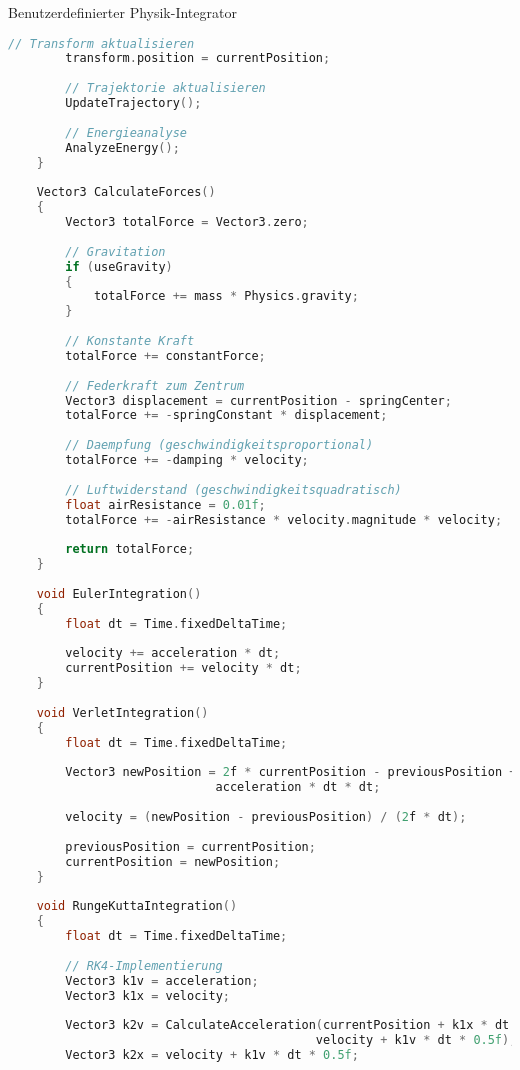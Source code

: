 \begin{code}{Benutzerdefinierter Physik-Integrator}
\begin{lstlisting}[language=C, style=basesmol]
        // Transform aktualisieren
        transform.position = currentPosition;
        
        // Trajektorie aktualisieren
        UpdateTrajectory();
        
        // Energieanalyse
        AnalyzeEnergy();
    }
    
    Vector3 CalculateForces() 
    {
        Vector3 totalForce = Vector3.zero;
        
        // Gravitation
        if (useGravity) 
        {
            totalForce += mass * Physics.gravity;
        }
        
        // Konstante Kraft
        totalForce += constantForce;
        
        // Federkraft zum Zentrum
        Vector3 displacement = currentPosition - springCenter;
        totalForce += -springConstant * displacement;
        
        // Daempfung (geschwindigkeitsproportional)
        totalForce += -damping * velocity;
        
        // Luftwiderstand (geschwindigkeitsquadratisch)
        float airResistance = 0.01f;
        totalForce += -airResistance * velocity.magnitude * velocity;
        
        return totalForce;
    }
    
    void EulerIntegration() 
    {
        float dt = Time.fixedDeltaTime;
        
        velocity += acceleration * dt;
        currentPosition += velocity * dt;
    }
    
    void VerletIntegration() 
    {
        float dt = Time.fixedDeltaTime;
        
        Vector3 newPosition = 2f * currentPosition - previousPosition + 
                             acceleration * dt * dt;
        
        velocity = (newPosition - previousPosition) / (2f * dt);
        
        previousPosition = currentPosition;
        currentPosition = newPosition;
    }
    
    void RungeKuttaIntegration() 
    {
        float dt = Time.fixedDeltaTime;
        
        // RK4-Implementierung
        Vector3 k1v = acceleration;
        Vector3 k1x = velocity;
        
        Vector3 k2v = CalculateAcceleration(currentPosition + k1x * dt * 0.5f, 
                                           velocity + k1v * dt * 0.5f);
        Vector3 k2x = velocity + k1v * dt * 0.5f;
        

\end{lstlisting}
\end{code}
